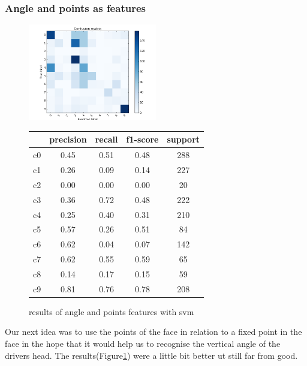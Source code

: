 \documentclass[10pt,twocolumn,letterpaper]{article}
\begin{document}
\subsubsection{Angle and points as features}
\begin{figure}[h]
	\centering
	\includegraphics[width=0.5\textwidth]{all_vs_all_headpose}\hspace{0.01\textwidth}
	\begin{tabular}{c||c|c|c|c}
	  & precision&recall&f1-score&support\\	\hline
	 c0&0.45&0.51&0.48&288\\
	 c1&0.26&0.09&0.14&227\\
	 c2&0.00&0.00&0.00&20\\
	 c3&0.36&0.72&0.48&222\\
	 c4&0.25&0.40&0.31&210\\
	 c5&0.57&0.26&0.51&84\\
	 c6&0.62&0.04&0.07&142\\
	 c7&0.62&0.55&0.59&65\\
	 c8&0.14&0.17&0.15&59\\
	 c9&0.81&0.76&0.78&208
	\end{tabular}
	\caption{results of angle and points features with svm}
	\label{headposeandpoints_feature}
	\end{figure}
Our next idea was to use the points of the face in relation to a fixed point in the face in the hope that it would help us to recognise the vertical angle of the drivers head. The results(Figure\ref{headposeandpoints_feature}) were a little bit better ut still far from good.
\end{document}
